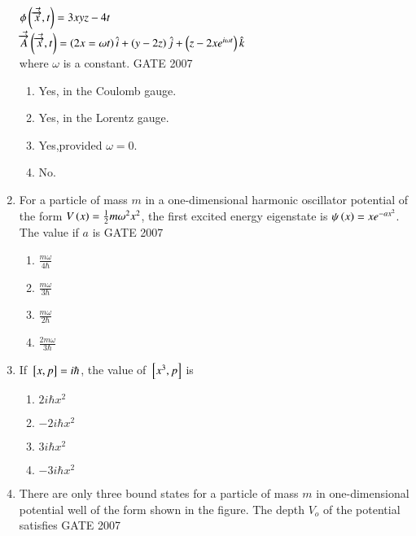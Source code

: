 \documentclass[journal]{IEEEtran}
\begin{document}
\begin{enumerate}
$\phi\left(\Vec{\overrightarrow{x}},t\right)=3xyz-4t$\\
$\Vec{\overrightarrow{A}}\left(\Vec{\overrightarrow{x}},t\right)= \left(2x=\omega t\right)\hat{i}+\left(y-2z\right)\hat{j}+\left(z-2xe^{i\omega t}\right)\hat{k}$\\
where $\omega$ is a constant.
\hfill{GATE 2007}\begin{enumerate}
    \item Yes, in the Coulomb gauge.
    \item Yes, in the Lorentz gauge.
    \item Yes,provided $\omega = 0$.
    \item No.
    
\end{enumerate}
\item For a particle of mass $m$ in a one-dimensional harmonic oscillator potential of the form $V\left(x\right)=\frac{1}{2}m\omega^2x^2$, the first excited energy eigenstate is $\psi\left(x\right) = xe^{-ax^2}$. The value if $a$ is 
\hfill{GATE 2007}\begin{enumerate}
    \item $\frac{m\omega}{4\hbar}$
    \item $\frac{m\omega}{3\hbar}$
    \item $\frac{m\omega}{2\hbar}$
    \item $\frac{2m\omega}{3\hbar}$
\end{enumerate}
\item If ${}\left[x,p\right]=i\hbar$, the value of ${}\left[x^3,p\right]$ is 
\begin{enumerate}
    \item $2i\hbar x^2$
    \item $-2i\hbar x^2$
    \item $3i\hbar x^2$
    \item $-3i\hbar x^2$
    
\end{enumerate}
\item There are only three bound states for a particle of mass $m$ in one-dimensional potential well of the form shown in the figure. The depth $V_o$ of the potential satisfies 
\hfill{GATE 2007}
\end{enumerate}
\end{document}
